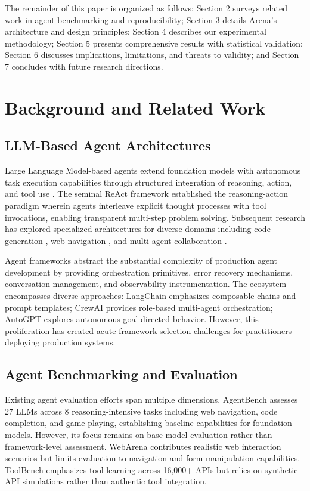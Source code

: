 \documentclass[sigconf,nonacm]{acmart}
\begin{document}
The remainder of this paper is organized as follows: Section 2 surveys related work in agent benchmarking and reproducibility; Section 3 details Arena's architecture and design principles; Section 4 describes our experimental methodology; Section 5 presents comprehensive results with statistical validation; Section 6 discusses implications, limitations, and threats to validity; and Section 7 concludes with future research directions.

\section{Background and Related Work}

\subsection{LLM-Based Agent Architectures}

Large Language Model-based agents extend foundation models with autonomous task execution capabilities through structured integration of reasoning, action, and tool use \cite{wang2024survey}. The seminal ReAct framework \cite{yao2023react} established the reasoning-action paradigm wherein agents interleave explicit thought processes with tool invocations, enabling transparent multi-step problem solving. Subsequent research has explored specialized architectures for diverse domains including code generation \cite{qin2023toolllm}, web navigation \cite{zhou2023webarena}, and multi-agent collaboration \cite{hong2023metagpt}.

Agent frameworks abstract the substantial complexity of production agent development by providing orchestration primitives, error recovery mechanisms, conversation management, and observability instrumentation. The ecosystem encompasses diverse approaches: LangChain \cite{langchain2023} emphasizes composable chains and prompt templates; CrewAI \cite{crewai2024} provides role-based multi-agent orchestration; AutoGPT \cite{autogpt2023} explores autonomous goal-directed behavior. However, this proliferation has created acute framework selection challenges for practitioners deploying production systems.

\subsection{Agent Benchmarking and Evaluation}

Existing agent evaluation efforts span multiple dimensions. AgentBench \cite{liu2023agentbench} assesses 27 LLMs across 8 reasoning-intensive tasks including web navigation, code completion, and game playing, establishing baseline capabilities for foundation models. However, its focus remains on base model evaluation rather than framework-level assessment. WebArena \cite{zhou2023webarena} contributes realistic web interaction scenarios but limits evaluation to navigation and form manipulation capabilities. ToolBench \cite{qin2023toolllm} emphasizes tool learning across 16,000+ APIs but relies on synthetic API simulations rather than authentic tool integration.
\end{document}
